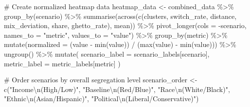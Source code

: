 \documentclass[
  11pt,
]{article}
\newenvironment{Shaded}{\begin{snugshade}}{\end{snugshade}}
\newcommand{\AttributeTok}[1]{\textcolor[rgb]{0.40,0.45,0.13}{#1}}
\newcommand{\CommentTok}[1]{\textcolor[rgb]{0.37,0.37,0.37}{#1}}
\newcommand{\FunctionTok}[1]{\textcolor[rgb]{0.28,0.35,0.67}{#1}}
\newcommand{\NormalTok}[1]{\textcolor[rgb]{0.00,0.23,0.31}{#1}}
\newcommand{\OtherTok}[1]{\textcolor[rgb]{0.00,0.23,0.31}{#1}}
\newcommand{\SpecialCharTok}[1]{\textcolor[rgb]{0.37,0.37,0.37}{#1}}
\newcommand{\StringTok}[1]{\textcolor[rgb]{0.13,0.47,0.30}{#1}}
\begin{document}
\begin{Shaded}
\begin{Highlighting}[]
\CommentTok{\# Create normalized heatmap data}
\NormalTok{heatmap\_data }\OtherTok{\textless{}{-}}\NormalTok{ combined\_data }\SpecialCharTok{\%\textgreater{}\%}
  \FunctionTok{group\_by}\NormalTok{(scenario) }\SpecialCharTok{\%\textgreater{}\%}
  \FunctionTok{summarise}\NormalTok{(}\FunctionTok{across}\NormalTok{(}\FunctionTok{c}\NormalTok{(clusters, switch\_rate, distance, mix\_deviation, share, ghetto\_rate), mean)) }\SpecialCharTok{\%\textgreater{}\%}
  \FunctionTok{pivot\_longer}\NormalTok{(}\AttributeTok{cols =} \SpecialCharTok{{-}}\NormalTok{scenario, }\AttributeTok{names\_to =} \StringTok{"metric"}\NormalTok{, }\AttributeTok{values\_to =} \StringTok{"value"}\NormalTok{) }\SpecialCharTok{\%\textgreater{}\%}
  \FunctionTok{group\_by}\NormalTok{(metric) }\SpecialCharTok{\%\textgreater{}\%}
  \FunctionTok{mutate}\NormalTok{(}\AttributeTok{normalized =}\NormalTok{ (value }\SpecialCharTok{{-}} \FunctionTok{min}\NormalTok{(value)) }\SpecialCharTok{/}\NormalTok{ (}\FunctionTok{max}\NormalTok{(value) }\SpecialCharTok{{-}} \FunctionTok{min}\NormalTok{(value))) }\SpecialCharTok{\%\textgreater{}\%}
  \FunctionTok{ungroup}\NormalTok{() }\SpecialCharTok{\%\textgreater{}\%}
  \FunctionTok{mutate}\NormalTok{(}
    \AttributeTok{scenario\_label =}\NormalTok{ scenario\_labels[scenario],}
    \AttributeTok{metric\_label =}\NormalTok{ metric\_labels[metric]}
\NormalTok{  )}

\CommentTok{\# Order scenarios by overall segregation level}
\NormalTok{scenario\_order }\OtherTok{\textless{}{-}} \FunctionTok{c}\NormalTok{(}\StringTok{"Income}\SpecialCharTok{\textbackslash{}n}\StringTok{(High/Low)"}\NormalTok{, }\StringTok{"Baseline}\SpecialCharTok{\textbackslash{}n}\StringTok{(Red/Blue)"}\NormalTok{, }
                   \StringTok{"Race}\SpecialCharTok{\textbackslash{}n}\StringTok{(White/Black)"}\NormalTok{, }\StringTok{"Ethnic}\SpecialCharTok{\textbackslash{}n}\StringTok{(Asian/Hispanic)"}\NormalTok{, }
                   \StringTok{"Political}\SpecialCharTok{\textbackslash{}n}\StringTok{(Liberal/Conservative)"}\NormalTok{)}


\end{Highlighting}
\end{Shaded}
\end{document}
